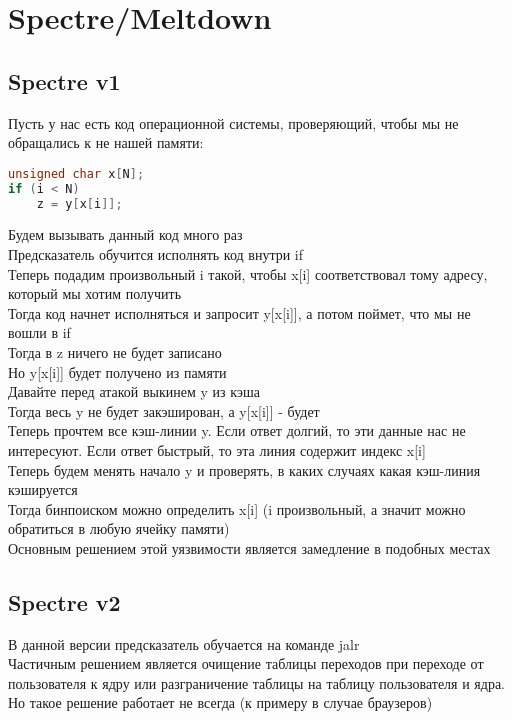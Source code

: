 \documentclass[12pt]{article}
\begin{document}
\section{Spectre/Meltdown}
\subsection{Spectre v1}
Пусть у нас есть код операционной системы, проверяющий, чтобы мы не обращались к не нашей памяти:\\
\begin{lstlisting}[language=C]
unsigned char x[N];
if (i < N)
    z = y[x[i]];
\end{lstlisting}
Будем вызывать данный код много раз\\
Предсказатель обучится исполнять код внутри if\\
Теперь подадим произвольный i такой, чтобы x[i] соответствовал тому адресу, который мы хотим получить\\
Тогда код начнет исполняться и запросит y[x[i]], а потом поймет, что мы не вошли в if\\
Тогда в z ничего не будет записано\\
Но y[x[i]] будет получено из памяти\\
Давайте перед атакой выкинем y из кэша\\
Тогда весь y не будет закэширован, а y[x[i]] - будет\\
Теперь прочтем все кэш-линии y. Если ответ долгий, то эти данные нас не интересуют. Если ответ быстрый, то эта линия содержит индекс x[i]\\
Теперь будем менять начало y и проверять, в каких случаях какая кэш-линия кэшируется\\
Тогда бинпоиском можно определить x[i] (i произвольный, а значит можно обратиться в любую ячейку памяти)\\
Основным решением этой уязвимости является замедление в подобных местах\\
\subsection{Spectre v2}
В данной версии предсказатель обучается на команде jalr\\
Частичным решением является очищение таблицы переходов при переходе от пользователя к ядру или разграничение таблицы на таблицу пользователя и ядра. Но такое решение работает не всегда (к примеру в случае браузеров)
\end{document}
